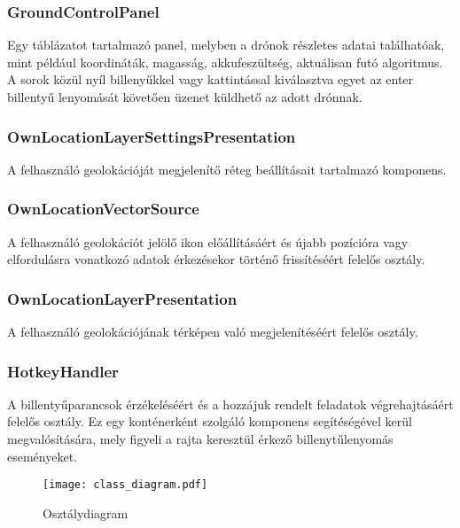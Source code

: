 \subsubsection{GroundControlPanel}

Egy táblázatot tartalmazó panel, melyben a drónok részletes adatai találhatóak,
mint például koordináták, magasság, akkufeszültség, aktuálisan futó algoritmus.
A sorok közül nyíl billenyűkkel vagy kattintással kiválasztva egyet az enter
billentyű lenyomását követően üzenet küldhető az adott drónnak.

\subsubsection{OwnLocationLayerSettingsPresentation}

A felhasználó geolokációját megjelenítő réteg beállításait tartalmazó komponens.

\subsubsection{OwnLocationVectorSource}

A felhasználó geolokációt jelölő ikon előállításáért és újabb pozícióra vagy
elfordulásra vonatkozó adatok érkezésekor történő frissítéséért felelős osztály.

\subsubsection{OwnLocationLayerPresentation}

A felhasználó geolokációjának térképen való megjelenítéséért felelős osztály.

\subsubsection{HotkeyHandler}

A billentyűparancsok érzékeléséért és a hozzájuk rendelt feladatok
végrehajtásáért felelős osztály. Ez egy konténerként szolgáló komponens
segítéségével kerül megvalósítására, mely figyeli a rajta keresztül érkező
billenytűlenyomás eseményeket.

\begin{figure}[H]
  \centering
    \texttt{[image: class\_diagram.pdf]}
  \caption{Osztálydiagram}
\end{figure}
